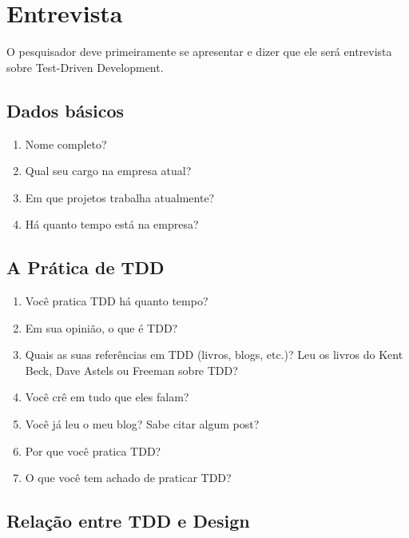 \chapter{Entrevista}
\label{ape:entrevista}

O pesquisador deve primeiramente se apresentar e dizer que ele será entrevista
sobre Test-Driven Development.

\section{Dados básicos}

\begin{enumerate}
	\item Nome completo?

	\item Qual seu cargo na empresa atual?
	
	\item Em que projetos trabalha atualmente?
	
	\item Há quanto tempo está na empresa?

\end{enumerate}

\section{A Prática de TDD}

\begin{enumerate}
	\item Você pratica TDD há quanto tempo?

	\item Em sua opinião, o que é TDD?
	
	\item Quais as suas referências em TDD (livros, blogs, etc.)? 
		  Leu os livros do Kent Beck, Dave Astels ou Freeman sobre TDD?

	\item Você crê em tudo que eles falam?
	
	\item Você já leu o meu blog? Sabe citar algum post?
	
	\item Por que você pratica TDD?

	\item O que você tem achado de praticar TDD?

\end{enumerate}

\section{Relação entre TDD e Design}

